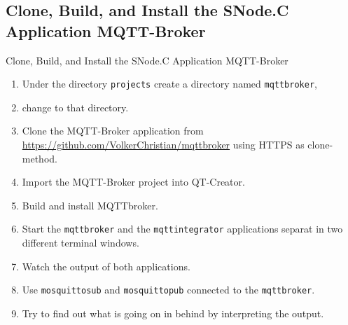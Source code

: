 \subsection{Clone, Build, and Install the SNode.C Application MQTT-Broker}

\begin{frame}{Clone, Build, and Install the SNode.C Application MQTT-Broker}
  \begin{enumerate}
    \item Under the directory \lstinline|projects| create a directory named \lstinline|mqttbroker|,
    \item change to that directory.
    \item Clone the MQTT-Broker application from \textcolor{fh-ooe-red}{\href{https://github.com/VolkerChristian/mqttbroker}{https://github.com/VolkerChristian/mqttbroker}} using \textcolor{fh-ooe-red}{HTTPS} as clone-method.
    \item Import the MQTT-Broker project into QT-Creator.
    \item Build and install MQTTbroker.
    \item Start the \texttt{\textcolor{fh-ooe-red}{mqttbroker}} and the \texttt{\textcolor{fh-ooe-red}{mqttintegrator}} applications separat in two different terminal windows.
    \item Watch the output of both applications.
    \item Use \texttt{\textcolor{fh-ooe-red}{mosquitto\textunderscore{}sub}} and  \texttt{\textcolor{fh-ooe-red}{mosquitto\textunderscore{}pub}} connected to the \texttt{\textcolor{fh-ooe-red}{mqttbroker}}.
    \item Try to find out what is going on in behind by interpreting the output.
  \end{enumerate}
\end{frame}
